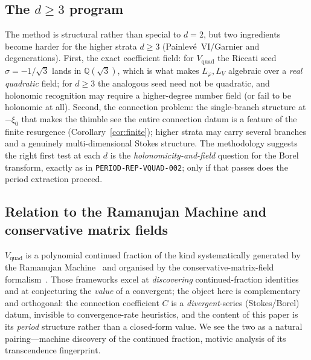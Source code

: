 \documentclass[11pt,reqno]{amsart}
\theoremstyle{plain}
\theoremstyle{definition}
\newcommand{\Vquad}{V_{\mathrm{quad}}}
\newcommand{\Lphi}{L_{\varphi}}
\newcommand{\LV}{L_{V}}
\newcommand{\Qsqrt}{\mathbb{Q}(\sqrt3)}
\newcommand{\xizero}{\xi_0}
\providecommand{\C}{}\renewcommand{\C}{C}
\begin{document}
\subsection{The $d\ge3$ program}
The method is structural rather than special to $d=2$, but two ingredients become harder for the
higher strata $d\ge3$ (Painlev\'e~VI/Garnier and degenerations). First, the exact coefficient
field: for $\Vquad$ the Riccati seed $\sigma=-1/\sqrt3$ lands in $\Qsqrt$, which is what makes
$\Lphi,\LV$ algebraic over a \emph{real quadratic} field; for $d\ge3$ the analogous seed need not
be quadratic, and holonomic recognition may require a higher-degree number field (or fail to be
holonomic at all). Second, the connection problem: the single-branch structure at $-\xizero$ that
makes the thimble see the entire connection datum is a feature of the finite resurgence
(Corollary~\ref{cor:finite}); higher strata may carry several branches and a genuinely
multi-dimensional Stokes structure. The methodology suggests the right first test at each $d$ is
the \emph{holonomicity-and-field} question for the Borel transform, exactly as in
\texttt{PERIOD-REP-VQUAD-002}; only if that passes does the period extraction proceed.

\subsection{Relation to the Ramanujan Machine and conservative matrix fields}
$\Vquad$ is a polynomial continued fraction of the kind systematically generated by the Ramanujan
Machine~\cite{RamanujanMachine} and organised by the conservative-matrix-field formalism~\cite{CMF}.
Those frameworks excel at \emph{discovering} continued-fraction identities and at conjecturing the
\emph{value} of a convergent; the object here is complementary and orthogonal: the connection
coefficient $\C$ is a \emph{divergent}-series (Stokes/Borel) datum, invisible to convergence-rate
heuristics, and the content of this paper is its \emph{period} structure rather than a closed-form
value. We see the two as a natural pairing---machine discovery of the continued fraction, motivic
analysis of its transcendence fingerprint.
\end{document}
